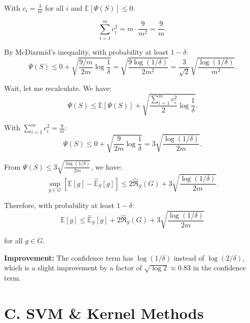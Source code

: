 \documentclass[letterpaper, 11pt]{article}
\newcommand{\1}{\mathds{1}}	%
\theoremstyle{definition}
\begin{document}
With $c_i = \frac{3}{m}$ for all $i$ and $\mathbb{E}[\Psi(S)] \leq 0$:

$$\sum_{i=1}^m c_i^2 = m \cdot \frac{9}{m^2} = \frac{9}{m}.$$

By McDiarmid's inequality, with probability at least $1-\delta$:
$$\Psi(S) \leq 0 + \sqrt{\frac{9/m}{2m}\log\frac{1}{\delta}} = \sqrt{\frac{9\log(1/\delta)}{2m^2}} = \frac{3}{\sqrt{2}}\sqrt{\frac{\log(1/\delta)}{m^2}}.$$

Wait, let me recalculate. We have:
$$\Psi(S) \leq \mathbb{E}[\Psi(S)] + \sqrt{\frac{\sum_{i=1}^m c_i^2}{2}\log\frac{1}{\delta}}.$$

With $\sum_{i=1}^m c_i^2 = \frac{9}{m}$:
$$\Psi(S) \leq 0 + \sqrt{\frac{9}{2m}\log\frac{1}{\delta}} = 3\sqrt{\frac{\log(1/\delta)}{2m}}.$$

From $\Psi(S) \leq 3\sqrt{\frac{\log(1/\delta)}{2m}}$, we have:
$$\sup_{g \in G} \left[\mathbb{E}[g] - \widehat{\mathbb{E}}_S[g]\right] \leq 2\widehat{\mathfrak{R}}_S(G) + 3\sqrt{\frac{\log(1/\delta)}{2m}}.$$

Therefore, with probability at least $1-\delta$:
$${\mathbb{E}[g] \leq \widehat{\mathbb{E}}_S[g] + 2\widehat{\mathfrak{R}}_S(G) + 3\sqrt{\frac{\log(1/\delta)}{2m}}}$$

for all $g \in G$.

\textbf{Improvement:} The confidence term has $\log(1/\delta)$ instead of $\log(2/\delta)$, which is a slight improvement by a factor of $\sqrt{\log 2} \approx 0.83$ in the confidence term.

\section*{C. SVM \& Kernel Methods}
\end{document}
